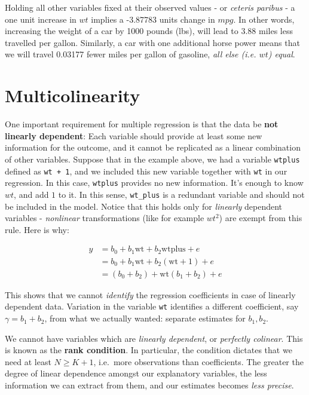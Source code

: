 \documentclass[]{book}
\newenvironment{note}{\begin{tcolorbox}[colback=blue!5!white,colframe=blue!75!black]}{\end{tcolorbox}}
\newenvironment{warning}{\begin{tcolorbox}[colback=orange!5!white,colframe=orange]}{\end{tcolorbox}}
\begin{document}
\begin{warning}
Holding all other variables fixed at their observed values - or
\emph{ceteris paribus} - a one unit increase in \(wt\) implies a
-3.87783 units change in \(mpg\). In other words, increasing the weight
of a car by 1000 pounds (lbs), will lead to 3.88 miles less travelled
per gallon. Similarly, a car with one additional horse power means that
we will travel 0.03177 fewer miles per gallon of gasoline, \emph{all
else (i.e. \(wt\)) equal}.
\end{warning}

\section{Multicolinearity}\label{multicol}

One important requirement for multiple regression is that the data be
\textbf{not linearly dependent}: Each variable should provide at least
some new information for the outcome, and it cannot be replicated as a
linear combination of other variables. Suppose that in the example
above, we had a variable \texttt{wtplus} defined as \texttt{wt\ +\ 1},
and we included this new variable together with \texttt{wt} in our
regression. In this case, \texttt{wtplus} provides no new information.
It's enough to know \(wt\), and add \(1\) to it. In this sense,
\texttt{wt\_plus} is a redundant variable and should not be included in
the model. Notice that this holds only for \emph{linearly} dependent
variables - \emph{nonlinear} transformations (like for example \(wt^2\))
are exempt from this rule. Here is why:

\begin{align}
y &= b_0 + b_1 \text{wt} + b_2 \text{wtplus} + e \\
  &= b_0 + b_1 \text{wt} + b_2 (\text{wt} + 1) + e \\
  &= (b_0 + b_2) + \text{wt} (b_1 + b_2) + e
\end{align}

This shows that we cannot \emph{identify} the regression coefficients in
case of linearly dependent data. Variation in the variable \texttt{wt}
identifies a different coefficient, say \(\gamma = b_1 + b_2\), from
what we actually wanted: separate estimates for \(b_1,b_2\).

\begin{note}
We cannot have variables which are \emph{linearly dependent}, or
\emph{perfectly colinear}. This is known as the \textbf{rank condition}.
In particular, the condition dictates that we need at least
\(N \geq K+1\), i.e.~more observations than coefficients. The greater
the degree of linear dependence amongst our explanatory variables, the
less information we can extract from them, and our estimates becomes
\emph{less precise}.
\end{note}
\end{document}
